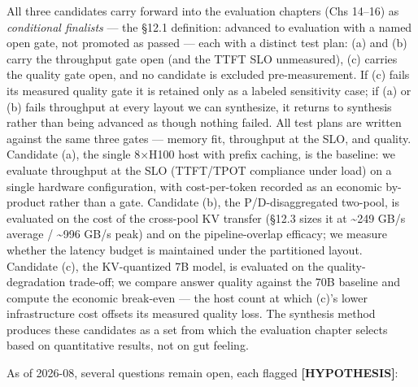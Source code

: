 \label{architecture-consequence}


All three candidates carry forward into the evaluation chapters (Chs
14--16) as \emph{conditional finalists} --- the §12.1 definition:
advanced to evaluation with a named open gate, not promoted as passed
--- each with a distinct test plan: (a) and (b) carry the throughput
gate open (and the TTFT SLO unmeasured), (c) carries the quality gate
open, and no candidate is excluded pre-measurement. If (c) fails its
measured quality gate it is retained only as a labeled sensitivity case;
if (a) or (b) fails throughput at every layout we can synthesize, it
returns to synthesis rather than being advanced as though nothing
failed. All test plans are written against the same three gates ---
memory fit, throughput at the SLO, and quality. Candidate (a), the
single 8×H100 host with prefix caching, is the baseline: we evaluate
throughput at the SLO (TTFT/TPOT compliance under load) on a single
hardware configuration, with cost-per-token recorded as an economic
by-product rather than a gate. Candidate (b), the P/D-disaggregated
two-pool, is evaluated on the cost of the cross-pool KV transfer (§12.3
sizes it at \textasciitilde249 GB/s average / \textasciitilde996 GB/s
peak) and on the pipeline-overlap efficacy; we measure whether the
latency budget is maintained under the partitioned layout. Candidate
(c), the KV-quantized 7B model, is evaluated on the quality-degradation
trade-off; we compare answer quality against the 70B baseline and
compute the economic break-even --- the host count at which (c)'s lower
infrastructure cost offsets its measured quality loss. The synthesis
method produces these candidates as a set from which the evaluation
chapter selects based on quantitative results, not on gut feeling.

\label{what-we-still-dont-know}


As of 2026-08, several questions remain open, each flagged
\textbf{\mbox{{[}HYPOTHESIS{]}}}:

